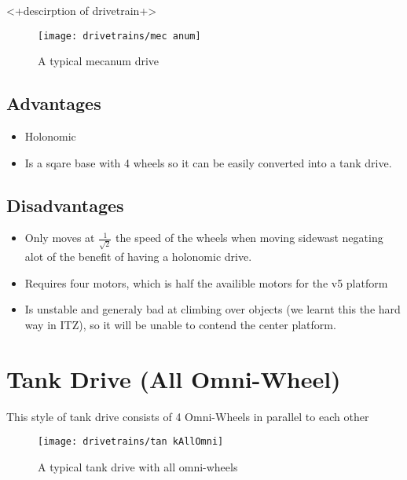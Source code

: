 \documentclass[../../main.tex]{subfiles}
\begin{document}
<+descirption of drivetrain+>

\begin{figure}[h]
	\centering

	\texttt{[image: drivetrains/mec
		anum]}
	\caption{A typical mecanum drive}
	\label{fig:drivetrainMecanum}
\end{figure}

\subsection{Advantages}

\begin{itemize}
	\item Holonomic
	\item Is a sqare base with 4 wheels so it can be easily converted
	      into a tank drive.
\end{itemize}

\subsection{Disadvantages}

\begin{itemize}
	\item Only moves at $\frac{1}{\sqrt{2}}$ the speed of the wheels when
	      moving sidewast
	      negating alot of the benefit of having a holonomic drive.
	\item Requires four motors, which is half the availible motors for the
	      v5 platform
	\item Is unstable and generaly bad at climbing over objects (we learnt
	      this the hard
	      way in ITZ), so it will be unable to contend the center platform.
\end{itemize}

\section{Tank Drive (All Omni-Wheel)}

This style of tank drive consists of 4 Omni-Wheels in parallel to each other 

\begin{figure}[h] \centering 

	\texttt{[image: drivetrains/tan kAllOmni]} \caption{A typical tank drive with all omni-wheels} \label{fig:drivetrainTankAllOmni} \end{figure} 
\end{document}
